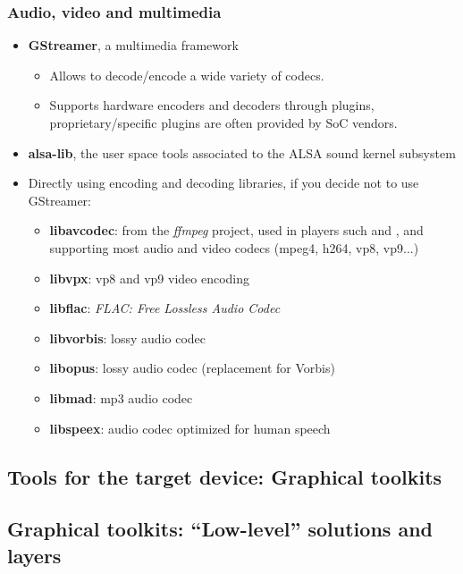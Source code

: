 \begin{frame}
  \frametitle{Audio, video and multimedia}
  \begin{itemize}
  \item {\bf GStreamer}, a multimedia framework
    \begin{itemize}
    \item Allows to decode/encode a wide variety of codecs.
    \item Supports hardware encoders and decoders through plugins,
      proprietary/specific plugins are often provided by SoC vendors.
    \end{itemize}
  \item {\bf alsa-lib}, the user space tools associated to the ALSA sound
    kernel subsystem
  \item Directly using encoding and decoding libraries, if you decide
    not to use GStreamer:
    \begin{itemize}
    \item {\bf libavcodec}: from the {\em ffmpeg} project, used in players
          such  and , and supporting most audio and
          video codecs (mpeg4, h264, vp8, vp9...)
    \item {\bf libvpx}: vp8 and vp9 video encoding
    \item {\bf libflac}: {\em FLAC: Free Lossless Audio Codec}
    \item {\bf libvorbis}: lossy audio codec
    \item {\bf libopus}: lossy audio codec (replacement for Vorbis)
    \item {\bf libmad}: mp3 audio codec
    \item {\bf libspeex}: audio codec optimized for human speech
    \end{itemize}
  \end{itemize}
\end{frame}

\subsection[Graphical toolkits]{Tools for the target device: Graphical
  toolkits}

\subsection[Low-level toolkits]{Graphical toolkits:
``Low-level'' solutions and layers}

